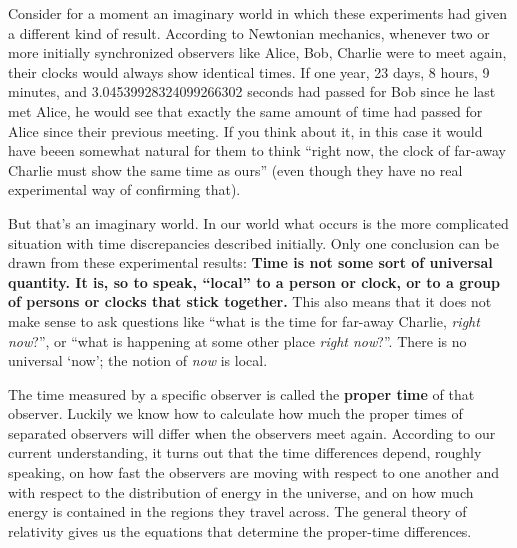 \documentclass[a4paper,12pt,%
onecolumn,oneside,%
british%
]{memoir}
\renewcommand*{\|}[1][]{\nonscript\:#1\vert\nonscript\:\mathopen{}}
\begin{document}
\medskip

Consider for a moment an imaginary world in which these experiments had given a different kind of result. According to Newtonian mechanics, whenever two or more initially synchronized observers like Alice, Bob, Charlie were to meet again, their clocks would always show identical times. If one year, 23 days, 8 hours, 9 minutes, and \num{3.04539928324099266302} seconds had passed for Bob since he last met Alice, he would see that exactly the same amount of time had passed for Alice since their previous meeting. If you think about it, in this case it would have beeen somewhat natural for them to think \enquote{right now, the clock of far-away Charlie must show the same time as ours} (even though they have no real experimental way of confirming that).

But that's an imaginary world. In our world what occurs is the more complicated situation with time discrepancies described initially. Only one conclusion can be drawn from these experimental results: \textbf{Time is not some sort of universal quantity. It is, so to speak, \enquote{local} to a person or clock, or to a group of persons or clocks that stick together.} This also means that it does not make sense to ask questions like \enquote{what is the time for far-away Charlie, \emph{right now}?}, or \enquote{what is happening at some other place \emph{right now}?}. There is no universal \enquote*{now}; the notion of \emph{now} is local.


The time measured by a specific observer is called the \textbf{proper time} of that observer. Luckily we know how to calculate how much the proper times of separated observers will differ when the observers meet again. According to our current understanding, it turns out that the time differences depend, roughly speaking, on how fast the observers are moving with respect to one another and with respect to the distribution of energy in the universe, and on how much energy is contained in the regions they travel across. The general theory of relativity gives us the equations that determine the proper-time differences.
\end{document}
